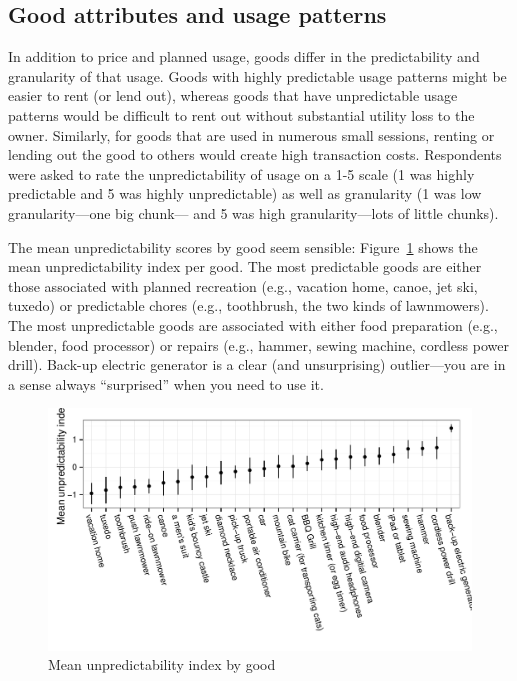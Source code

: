 \documentclass[11pt]{article}
\begin{document}
\subsection{Good attributes and usage patterns} 
In addition to price and planned usage, goods differ in the predictability and granularity of that usage.
Goods with highly predictable usage patterns might be easier to rent (or lend out), whereas goods that have unpredictable usage patterns would be difficult to rent out without substantial utility loss to the owner.
Similarly, for goods that are used in numerous small sessions, renting
or lending out the good to others would create high transaction costs.
Respondents were asked to rate the unpredictability of usage on a 1-5 scale (1 was highly predictable and 5 was highly unpredictable) as well as granularity (1 was low granularity---one big chunk--- and 5 was high granularity---lots of little chunks).  

The mean unpredictability scores by good seem sensible: 
Figure~\ref{fig:predict_index} shows the mean unpredictability index per good. 
The most predictable goods are either those associated with planned recreation (e.g., vacation home, canoe, jet ski, tuxedo) or predictable chores (e.g., toothbrush, the two kinds of lawnmowers). 
The most unpredictable goods are associated with either food preparation (e.g., blender, food processor) or repairs (e.g., hammer, sewing machine, cordless power drill). 
Back-up electric generator is a clear (and unsurprising) outlier---you are in a sense always ``surprised'' when you need to use it. 

\begin{figure}
\centering 
\caption{Mean unpredictability index by good \label{fig:predict_index} }
\begin{minipage}{0.90 \linewidth}
\includegraphics[width = \linewidth]{./plots/predictability.pdf} 
\end{minipage} 
\end{figure} 
\end{document}
